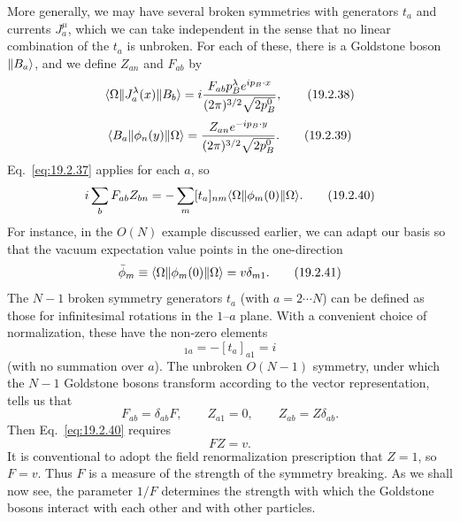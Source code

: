 More generally, we may have several broken symmetries with generators $t_a$
and currents $J^\mu_a$, which we can take independent in the sense that no
linear combination of the $t_a$ is unbroken. For each of these, there is a
Goldstone boson $\lVert B_a\rangle$, and we define $Z_{an}$ and $F_{ab}$ by
\begin{equation}
 \langle \Omega\rVert J^\lambda_a(x)\lVert B_b\rangle
 =i\frac{F_{ab}p_B^\lambda e^{ip_B\cdot x}}
 {(2\pi)^{3/2}\sqrt{2p_B^0}},
 \tag{19.2.38}\label{eq:19.2.38}
\end{equation}
\begin{equation}
 \langle B_a\rVert\phi_n(y)\lVert \Omega\rangle
 =\frac{Z_{an}e^{-ip_B\cdot y}}
 {(2\pi)^{3/2}\sqrt{2p_B^0}}.
 \tag{19.2.39}\label{eq:19.2.39}
\end{equation}
Eq.~\eqref{eq:19.2.37} applies for each $a$, so
\begin{equation}
 i\sum_b F_{ab}Z_{bn}
 =-\sum_m[t_a]_{nm}\langle \Omega\rVert\phi_m(0)\lVert \Omega\rangle.
 \tag{19.2.40}\label{eq:19.2.40}
\end{equation}
For instance, in the $O(N)$ example discussed earlier, we can adapt our basis
so that the vacuum expectation value points in the one-direction
\begin{equation}
 \bar\phi_m\equiv\langle \Omega\rVert\phi_m(0)\lVert \Omega\rangle
 =v\delta_{m1}.
 \tag{19.2.41}\label{eq:19.2.41}
\end{equation}
The $N-1$ broken symmetry generators $t_a$ (with $a=2\cdots N$) can be
defined as those for infinitesimal rotations in the $1$--$a$ plane. With a
convenient choice of normalization, these have the non-zero elements
\begin{equation}
 [t_a]_{1a}=-[t_a]_{a1}=i
 \tag{19.2.42}\label{eq:19.2.42}
\end{equation}
(with no summation over $a$). The unbroken $O(N-1)$ symmetry, under which the
$N-1$ Goldstone bosons transform according to the vector representation,
tells us that
\begin{equation}
 F_{ab}=\delta_{ab}F,\qquad Z_{a1}=0,\qquad Z_{ab}=Z\delta_{ab}.
 \tag{19.2.43}\label{eq:19.2.43}
\end{equation}
Then Eq.~\eqref{eq:19.2.40} requires
\begin{equation}
 FZ=v.
 \tag{19.2.44}\label{eq:19.2.44}
\end{equation}
It is conventional to adopt the field renormalization prescription that
$Z=1$, so $F=v$. Thus $F$ is a measure of the strength of the symmetry
breaking. As we shall now see, the parameter $1/F$ determines the strength
with which the Goldstone bosons interact with each other and with other
particles.

